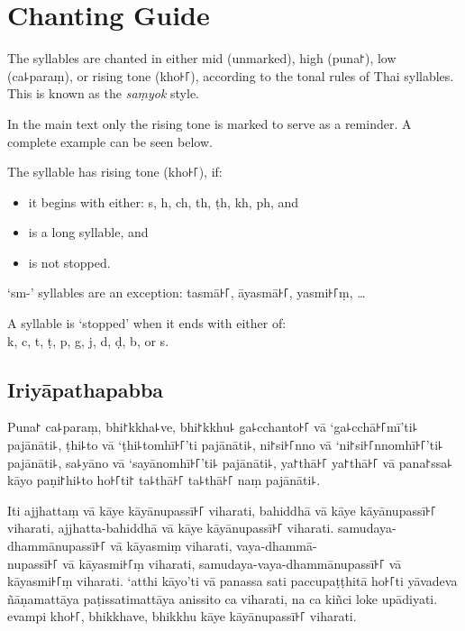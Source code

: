 \cleartorecto
\chapter{Chanting Guide}

The syllables are chanted in either mid (unmarked), high (puna꜓), low
(ca꜕paraṃ), or rising tone (kho꜔꜒), according to the tonal rules of Thai
syllables. This is known as the \emph{saṃyok} style.

In the main text only the rising tone is marked to serve as a reminder. A
complete example can be seen below.

The syllable has rising tone (kho꜔꜒), if:

\begin{itemize}[itemsep=0pt, parsep=0pt, topsep=0pt]
  \item it begins with either: s, h, ch, th, ṭh, kh, ph, and
  \item is a long syllable, and
  \item is not stopped.
\end{itemize}

`sm-' syllables are an exception: tasmā꜔꜒, āyasmā꜔꜒, yasmi꜔꜒ṃ, \ldots{}

A syllable is `stopped' when it ends with either of:\\
k, c, t, ṭ, p, g, j, d, ḍ, b, or s.

\enlargethispage{2\baselineskip}

\section*{Iriyāpathapabba}

Puna꜓ ca꜕paraṃ, bhi꜓kkha꜕ve, bhi꜓kkhu꜕ ga꜕cchanto꜔꜒ vā ‘ga꜕cchā꜔꜒mī’ti꜕ pajānāti꜕, ṭhi꜕to vā
‘ṭhi꜕tomhī꜔꜒’ti pajānāti꜕, ni꜓si꜔꜒nno vā ‘ni꜓si꜔꜒nnomhī꜔꜒’ti꜕ pajānāti꜕, sa꜕yāno vā
‘sayānomhī꜔꜒’ti꜕ pajānāti꜕, ya꜓thā꜔꜒ ya꜓thā꜔꜒ vā pana꜓ssa꜕ kāyo paṇi꜓hi꜕to ho꜔꜒ti꜓ ta꜕thā꜔꜒ ta꜕thā꜔꜒
naṃ pajānāti꜕.

Iti ajjhattaṃ vā kāye kāyānupassī꜔꜒ viharati, bahiddhā vā kāye kāyānupassī꜔꜒
viharati, ajjhatta-bahiddhā vā kāye kāyānupassī꜔꜒ viharati. samudaya-dhammānupassī꜔꜒
vā kāyasmiṃ viharati, vaya-dhammā-\\
nupassī꜔꜒ vā kāyasmi꜔꜒ṃ viharati, samudaya-vaya-dhammānupassī꜔꜒ vā kāyasmi꜔꜒ṃ viharati.
‘atthi kāyo’ti vā panassa sati paccupaṭṭhitā ho꜔꜒ti yāvadeva ñāṇamattāya
paṭissatimattāya anissito ca viharati, na ca kiñci loke upādiyati. evampi kho꜔꜒,
bhikkhave, bhikkhu kāye kāyānupassī꜔꜒ viharati.
